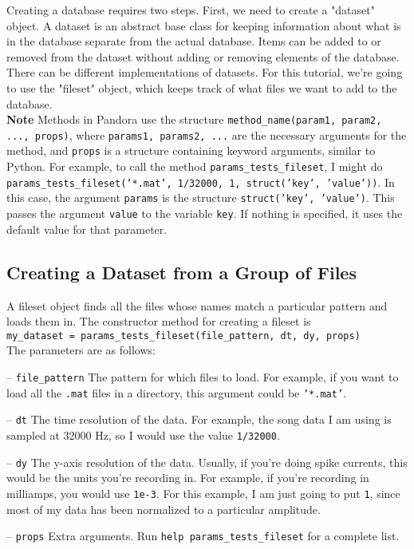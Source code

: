 \documentclass{article}
\let\oldmarginpar\marginpar
\renewcommand\marginpar[1]{\-\oldmarginpar[\raggedleft #1]%
{\raggedright #1}}
\newenvironment{checklist}{%
  \begin{list}{}{}%
  \let\olditem\item
  \renewcommand\item{\olditem -- \marginpar{$\Box$} }
  \newcommand\checkeditem{\olditem -- \marginpar{$\CheckedBox$} }
}{%
  \end{list}
}
\begin{document}
Creating a database requires two steps. First, we need to create a "dataset" object. A dataset is an abstract base class for keeping information about what is in the database separate from the actual database. Items can be added to or removed from the dataset without adding or removing elements of the database.\\

There can be different implementations of datasets. For this tutorial, we're going to use the "fileset" object, which keeps track of what files we want to add to the database.\\

\textbf{Note} Methods in Pandora use the structure \texttt{method\_name(param1, param2, ..., props)}, where \texttt{params1, params2, ...} are the necessary arguments for the method, and \texttt{props} is a structure containing keyword arguments, similar to Python. For example, to call the method \texttt{params\_tests\_fileset}, I might do \texttt{params\_tests\_fileset('*.mat', 1/32000, 1, struct('key', 'value'))}. In this case, the argument \texttt{params} is the structure \texttt{struct('key', 'value')}. This passes the argument \texttt{value} to the variable \texttt{key}. If nothing is specified, it uses the default value for that parameter.

\subsection{Creating a Dataset from a Group of Files}

A fileset object finds all the files whose names match a particular pattern and loads them in. The constructor method for creating a fileset is\\

\texttt{my\_dataset = params\_tests\_fileset(file\_pattern, dt, dy, props)}\\

The parameters are as follows:\\

\begin{checklist}
	\item		\texttt{file\_pattern} The pattern for which files to load. For example, if you want to load all the \texttt{.mat} files in a directory, this argument could be \texttt{'*.mat'}.
	\item		\texttt{dt} The time resolution of the data. For example, the song data I am using is sampled at 32000 Hz, so I would use the value \texttt{1/32000}.
	\item		\texttt{dy} The y-axis resolution of the data. Usually, if you're doing spike currents, this would be the units you're recording in. For example, if you're recording in milliamps, you would use \texttt{1e-3}. For this example, I am just going to put \texttt{1}, since most of my data has been normalized to a particular amplitude.
	\item		\texttt{props} Extra arguments. Run \texttt{help params\_tests\_fileset} for a complete list.
\end{checklist}
\end{document}
